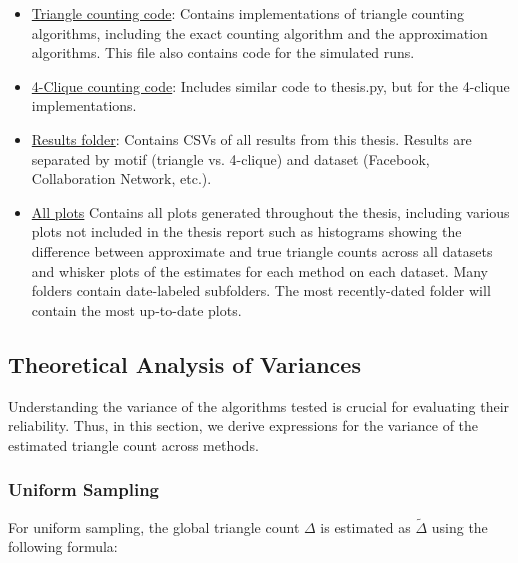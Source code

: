 \documentclass[11pt, margin=1in]{article}
\begin{document}
\begin{itemize}
    \item \href{https://github.com/sophia-hubscher/triangle-counting/blob/main/thesis.py}{Triangle counting code}: 
    Contains implementations of triangle counting algorithms, including the exact counting algorithm and the approximation algorithms. This file also contains code for the simulated runs.
    
    \item \href{https://github.com/sophia-hubscher/triangle-counting/blob/main/thesis_4_clique.py}{4-Clique counting code}: 
    Includes similar code to thesis.py, but for the 4-clique implementations.
    
    \item \href{https://github.com/sophia-hubscher/triangle-counting/tree/main/results}{Results folder}: 
    Contains CSVs of all results from this thesis. Results are separated by motif (triangle vs. 4-clique) and dataset (Facebook, Collaboration Network, etc.).

    \item \href{https://github.com/sophia-hubscher/triangle-counting/tree/main/plots}{All plots}
    Contains all plots generated throughout the thesis, including various plots not included in the thesis report such as histograms showing the difference between approximate and true triangle counts across all datasets and whisker plots of the estimates for each method on each dataset. Many folders contain date-labeled subfolders. The most recently-dated folder will contain the most up-to-date plots.
\end{itemize}

\subsection{Theoretical Analysis of Variances}

Understanding the variance of the algorithms tested is crucial for evaluating their reliability.
Thus, in this section, we derive expressions for the variance of the estimated triangle count across methods.

\subsubsection{Uniform Sampling}

For uniform sampling, the global triangle count $\Delta$ is estimated as $\tilde{\Delta}$ using the following formula:
\end{document}
